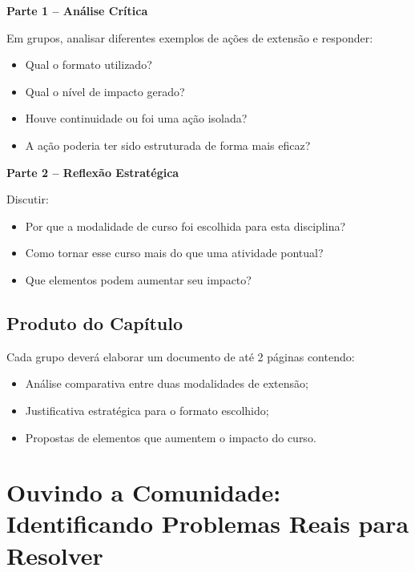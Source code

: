 \documentclass[12pt,a4paper]{article}
\begin{document}
\textbf{Parte 1 – Análise Crítica}

Em grupos, analisar diferentes exemplos de ações de extensão e responder:

\begin{itemize}
    \item Qual o formato utilizado?
    \item Qual o nível de impacto gerado?
    \item Houve continuidade ou foi uma ação isolada?
    \item A ação poderia ter sido estruturada de forma mais eficaz?
\end{itemize}

\bigskip

\textbf{Parte 2 – Reflexão Estratégica}

Discutir:

\begin{itemize}
    \item Por que a modalidade de curso foi escolhida para esta disciplina?
    \item Como tornar esse curso mais do que uma atividade pontual?
    \item Que elementos podem aumentar seu impacto?
\end{itemize}

\subsection*{Produto do Capítulo}

Cada grupo deverá elaborar um documento de até 2 páginas contendo:

\begin{itemize}
    \item Análise comparativa entre duas modalidades de extensão;
    \item Justificativa estratégica para o formato escolhido;
    \item Propostas de elementos que aumentem o impacto do curso.
\end{itemize}





\section{Ouvindo a Comunidade: Identificando Problemas Reais para Resolver}
\end{document}
